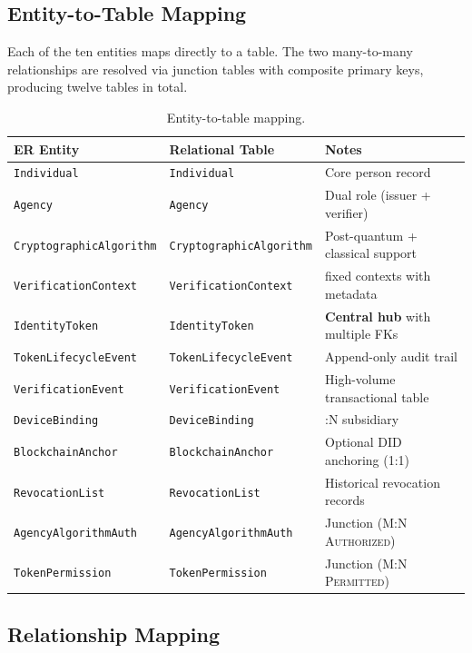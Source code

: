 \documentclass[11pt,letterpaper]{article}
\newcommand{\entity}[1]{\texttt{\color{navydark}#1}}
\newcommand{\thead}[1]{\textbf{\color{white}\small #1}}
\begin{document}
\subsection{Entity-to-Table Mapping}

Each of the ten entities maps directly to a table. The two many-to-many relationships are resolved via junction tables with composite primary keys, producing twelve tables in total.

\begin{table}[H]
\centering
\footnotesize
\caption{Entity-to-table mapping.}
\begin{tabularx}{\textwidth}{l l >{\RaggedRight\arraybackslash}X}
\toprule
\rowcolor{tabheader}
\thead{ER Entity} & \thead{Relational Table} & \thead{Notes} \\
\midrule
\entity{Individual} & \texttt{Individual} & Core person record \\
\entity{Agency} & \texttt{Agency} & Dual role (issuer + verifier) \\
\entity{CryptographicAlgorithm} & \texttt{CryptographicAlgorithm} & Post-quantum + classical support \\
\entity{VerificationContext} & \texttt{VerificationContext} & 7 fixed contexts with metadata \\
\entity{IdentityToken} & \texttt{IdentityToken} & \textbf{Central hub} with multiple FKs \\
\entity{TokenLifecycleEvent} & \texttt{TokenLifecycleEvent} & Append-only audit trail \\
\entity{VerificationEvent} & \texttt{VerificationEvent} & High-volume transactional table \\
\entity{DeviceBinding} & \texttt{DeviceBinding} & 1:N subsidiary \\
\entity{BlockchainAnchor} & \texttt{BlockchainAnchor} & Optional DID anchoring (1:1) \\
\entity{RevocationList} & \texttt{RevocationList} & Historical revocation records \\
\midrule
\entity{AgencyAlgorithmAuth} & \texttt{AgencyAlgorithmAuth} & Junction (M:N \textsc{Authorized}) \\
\entity{TokenPermission} & \texttt{TokenPermission} & Junction (M:N \textsc{Permitted}) \\
\bottomrule
\end{tabularx}
\end{table}

\subsection{Relationship Mapping}
\end{document}
